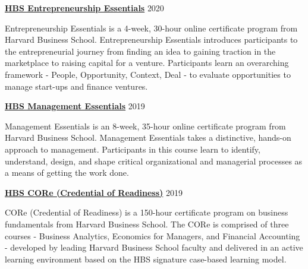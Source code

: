 \documentclass[margin,line]{res}
\begin{document}
\begin{resume}
{\bf \href{https://online.hbs.edu/courses/entrepreneurship-essentials/}{HBS Entrepreneurship Essentials}} \hfill {2020}\\
\vspace*{-3.5mm}
\begin{addmargin}[0pt]{.1\linewidth}
\vspace*{-1mm}
Entrepreneurship Essentials is a 4-week, 30-hour online certificate program from Harvard Business School. Entrepreneurship Essentials introduces participants to the entrepreneurial journey from finding an idea to gaining traction in the marketplace to raising capital for a venture. Participants learn an overarching framework - People, Opportunity, Context, Deal - to evaluate opportunities to manage start-ups and finance ventures.
\end{addmargin}

\vspace*{-2mm}

{\bf \href{https://online.hbs.edu/courses/management-essentials/}{HBS Management Essentials}} \hfill {2019}\\
\vspace*{-3.5mm}
\begin{addmargin}[0pt]{.1\linewidth}
\vspace*{-1mm}
Management Essentials is an 8-week, 35-hour online certificate program from Harvard Business School. Management Essentials takes a distinctive, hands-on approach to management. Participants in this course learn to identify, understand, design, and shape critical organizational and managerial processes as a means of getting the work done.
\end{addmargin}

\vspace*{-2mm}

{\bf \href{https://online.hbs.edu/courses/core/}{HBS CORe (Credential of Readiness)}} \hfill {2019}\\
\vspace*{-3.5mm}
\begin{addmargin}[0pt]{.1\linewidth}
\vspace*{-1mm}
CORe (Credential of Readiness) is a 150-hour certificate program on business fundamentals from Harvard Business School. The CORe is comprised of three courses - Business Analytics, Economics for Managers, and Financial Accounting - developed by leading Harvard Business School faculty and delivered in an active learning environment based on the HBS signature case-based learning model.
\end{addmargin}


\end{resume}
\end{document}
